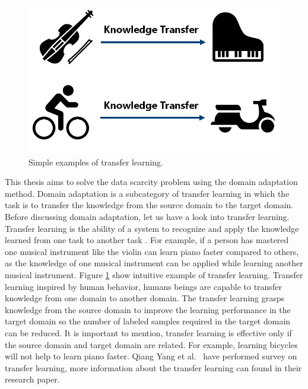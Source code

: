 \begin{figure}[H]
        \begin{center}
 	    \includegraphics[scale=0.40]{images/TransferLearning.png}
	    \caption[Simple examples of transfer learning.]{Simple examples of transfer learning.}
	    \label{fig:TransferLearning}
	    \end{center}
\end{figure}

This thesis aims to solve the data scarcity problem using the domain adaptation method. Domain adaptation is a subcategory of transfer learning in which the task is to transfer the knowledge from the source domain to the target domain. Before discussing domain adaptation, let us have a look into transfer learning. Transfer learning is the ability of a system to recognize and apply the knowledge learned from one task to another task \cite{zhuang2020comprehensive}.  For example, if a person has mastered one musical instrument like the violin can learn piano faster compared to others, as the knowledge of one musical instrument can be applied while learning another musical instrument. Figure \ref{fig:TransferLearning} show intuitive example of transfer learning. Transfer learning inspired by human behavior, humans beings are capable to transfer knowledge from one domain to another domain. The transfer learning grasps knowledge from the source domain to improve the learning performance in the target domain so the number of labeled samples required in the target domain can be reduced. It is important to mention, transfer learning is effective only if the source domain and target domain are related. For example, learning bicycles will not help to learn piano faster. Qiang Yang et al.\ \cite{5288526} have performed survey on transfer learning, more information about the transfer learning can found in their research paper.  

